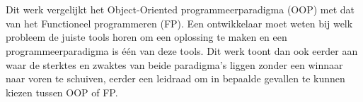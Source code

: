 
%
%

%



\chapter*{}
Dit werk vergelijkt het Object-Oriented programmeerparadigma (OOP) met dat van het Functioneel programmeren (FP). Een ontwikkelaar moet weten bij welk probleem de juiste tools horen om een oplossing te maken en een programmeerparadigma is één van deze tools. Dit werk toont dan ook eerder aan waar de sterktes en zwaktes van beide paradigma's liggen zonder een winnaar naar voren te schuiven, eerder een leidraad om in bepaalde gevallen te kunnen kiezen tussen OOP of FP. 

